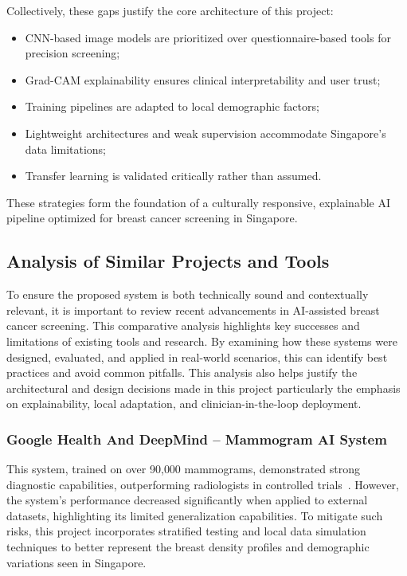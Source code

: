 \documentclass[12pt]{article}
\begin{document}
\vspace{0.5em}
Collectively, these gaps justify the core architecture of this project:
\begin{itemize}
    \item CNN-based image models are prioritized over questionnaire-based tools for precision screening;
    \item Grad-CAM explainability ensures clinical interpretability and user trust;
    \item Training pipelines are adapted to local demographic factors;
    \item Lightweight architectures and weak supervision accommodate Singapore's data limitations;
    \item Transfer learning is validated critically rather than assumed.
\end{itemize}

These strategies form the foundation of a culturally responsive, explainable AI pipeline optimized for breast cancer screening in Singapore.


\subsection{Analysis of Similar Projects and Tools}

To ensure the proposed system is both technically sound and contextually relevant, it is important to review recent advancements in AI-assisted breast cancer screening. This comparative analysis highlights key successes and limitations of existing tools and research. By examining how these systems were designed, evaluated, and applied in real-world scenarios, this can identify best practices and avoid common pitfalls. This analysis also helps justify the architectural and design decisions made in this project particularly the emphasis on explainability, local adaptation, and clinician-in-the-loop deployment.


\subsubsection{Google Health And DeepMind – Mammogram AI System~\cite{11}}
    This system, trained on over 90{,}000 mammograms, demonstrated strong diagnostic capabilities, outperforming radiologists in controlled trials~\cite{11}. However, the system's performance decreased significantly when applied to external datasets, highlighting its limited generalization capabilities. To mitigate such risks, this project incorporates stratified testing and local data simulation techniques to better represent the breast density profiles and demographic variations seen in Singapore.
\end{document}
